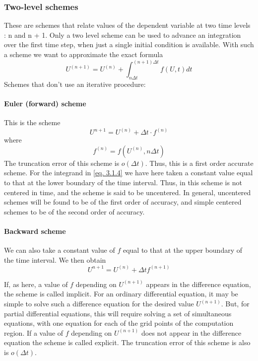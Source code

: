 \subsubsection{Two-level schemes}
These are schemes that relate values of the dependent variable at two time levels : n and n + 1. Only a two level scheme can be used to advance an integration over the first time step, when just a single initial condition is available. With such a scheme we want to approximate the exact formula
\begin{equation}\label{eq. 3.1.4}
	U^{(n+1)}=U^{(n)}+\int_{n\Delta t}^{(n+1)\Delta t}f(U,t)dt
\end{equation}
Schemes that don't use an iterative procedure:
\paragraph{Euler (forward) scheme}
This is the scheme
\begin{equation}\label{3.1.5}
	U^{n+1}=U^{(n)}+\Delta t\cdot f^{(n)}
\end{equation}
where
$$f^{(n)}=f\left(U^{(n)},n\Delta t\right)$$
The truncation error of this scheme is $o(\Delta t)$. Thus, this is a first order accurate scheme. For the integrand in \ref{eq. 3.1.4} we have here taken a constant value equal to that at the lower boundary of the time interval. Thus, in this scheme is not centered in time, and the scheme is said to be uncentered. In general, uncentered schemes will be found to be of the first order of accuracy, and simple centered schemes to be of the second order of accuracy.
\paragraph{Backward scheme}
We can also take a constant value of $f$ equal to that at the upper boundary of the time interval. We then obtain
\begin{equation}\label{3.1.6}
	U^{n+1}=U^{(n)}+\Delta t f^{(n+1)}
\end{equation}

If, as here, a value of $f$ depending on $U^{(n+1)}$ appears in the difference equation, the scheme is called implicit. For an ordinary differential equation, it may be simple to solve such a difference equation for the desired value $U^{(n+1)}$. But, for partial differential equations, this will require solving a set of simultaneous equations, with one equation for each of the grid points of the computation region. If a value of $f$ depending on $U^{(n+1)}$ does not appear in the difference equation the scheme is called explicit. The truncation error of this scheme is also is $o(\Delta t)$.
